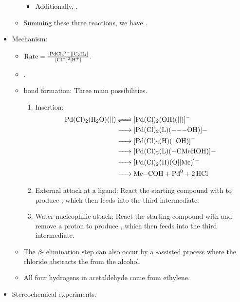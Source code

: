 \documentclass[../notes.tex]{subfiles}
\begin{document}
\begin{itemize}
\begin{itemize}
\begin{itemize}
            \item Additionally, .
        \end{itemize}
        \item Summing these three reactions, we have .
    \end{itemize}
    \item Mechanism:
    \begin{itemize}
        \item $\text{Rate}=\frac{\ce{[PdCl4^2-][C2H4]}}{\ce{[Cl^-]^2[H^+]}}$.
        \item {}.
        \item {} bond formation: Three main possibilities.
        \begin{enumerate}
            \item Insertion:
            \begin{align*}
                \ce{Pd(Cl)2(H2O)(||)} &\ce{<=>} \ce{[Pd(Cl)2(OH)(||)]-}\\
                &\ce{->} \ce{[Pd(Cl)2(L)(---OH)]-}\\
                &\ce{->} \ce{[Pd(Cl)2(H)(||OH)]-}\\
                &\ce{->} \ce{[Pd(Cl)2(L)(-CMeHOH)]-}\\
                &\ce{->} \ce{[Pd(Cl)2(H)(O||Me)]-}\\
                &\ce{->} \ce{Me-COH + Pd^0 + 2HCl}
            \end{align*}
            \item External attack at a ligand: React the starting compound with  to produce \ce{[Pd(Cl)2(H2O)(---OH)]-}, which then feeds into the third intermediate.
            \item Water nucleophilic attack: React the starting compound with  and remove a proton to produce \ce{[Pd(Cl)2(H2O)(---OH)]-}, which then feeds into the third intermediate.
        \end{enumerate}
        \item The $\beta$- elimination step can also occur by a -assisted process where the chloride abstracts the  from the alcohol.
        \item All four hydrogens in acetaldehyde come from ethylene.
    \end{itemize}
    \item Stereochemical experiments:
    \begin{itemize}

\end{itemize}
\end{itemize}
\end{document}
